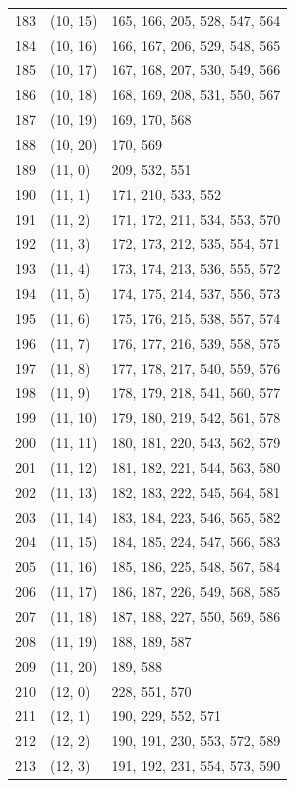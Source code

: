 \documentclass{article}
\begin{document}
\begin{longtable}{lll}
  183 & (10, 15) & 165, 166, 205, 528, 547, 564 \\
  184 & (10, 16) & 166, 167, 206, 529, 548, 565 \\
  185 & (10, 17) & 167, 168, 207, 530, 549, 566 \\
  186 & (10, 18) & 168, 169, 208, 531, 550, 567 \\
  187 & (10, 19) & 169, 170, 568 \\
  188 & (10, 20) & 170, 569 \\
  189 & (11, 0) & 209, 532, 551 \\
  190 & (11, 1) & 171, 210, 533, 552 \\
  191 & (11, 2) & 171, 172, 211, 534, 553, 570 \\
  192 & (11, 3) & 172, 173, 212, 535, 554, 571 \\
  193 & (11, 4) & 173, 174, 213, 536, 555, 572 \\
  194 & (11, 5) & 174, 175, 214, 537, 556, 573 \\
  195 & (11, 6) & 175, 176, 215, 538, 557, 574 \\
  196 & (11, 7) & 176, 177, 216, 539, 558, 575 \\
  197 & (11, 8) & 177, 178, 217, 540, 559, 576 \\
  198 & (11, 9) & 178, 179, 218, 541, 560, 577 \\
  199 & (11, 10) & 179, 180, 219, 542, 561, 578 \\
  200 & (11, 11) & 180, 181, 220, 543, 562, 579 \\
  201 & (11, 12) & 181, 182, 221, 544, 563, 580 \\
  202 & (11, 13) & 182, 183, 222, 545, 564, 581 \\
  203 & (11, 14) & 183, 184, 223, 546, 565, 582 \\
  204 & (11, 15) & 184, 185, 224, 547, 566, 583 \\
  205 & (11, 16) & 185, 186, 225, 548, 567, 584 \\
  206 & (11, 17) & 186, 187, 226, 549, 568, 585 \\
  207 & (11, 18) & 187, 188, 227, 550, 569, 586 \\
  208 & (11, 19) & 188, 189, 587 \\
  209 & (11, 20) & 189, 588 \\
  210 & (12, 0) & 228, 551, 570 \\
  211 & (12, 1) & 190, 229, 552, 571 \\
  212 & (12, 2) & 190, 191, 230, 553, 572, 589 \\
  213 & (12, 3) & 191, 192, 231, 554, 573, 590 \\

\end{longtable}
\end{document}

